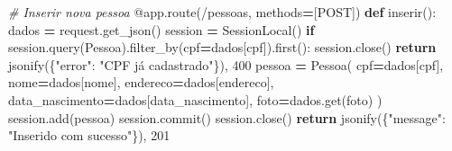 \documentclass[
]{book}
\newenvironment{Shaded}{\begin{snugshade}}{\end{snugshade}}
\newcommand{\AttributeTok}[1]{\textcolor[rgb]{0.13,0.29,0.53}{#1}}
\newcommand{\CommentTok}[1]{\textcolor[rgb]{0.56,0.35,0.01}{\textit{#1}}}
\newcommand{\ControlFlowTok}[1]{\textcolor[rgb]{0.13,0.29,0.53}{\textbf{#1}}}
\newcommand{\DecValTok}[1]{\textcolor[rgb]{0.00,0.00,0.81}{#1}}
\newcommand{\KeywordTok}[1]{\textcolor[rgb]{0.13,0.29,0.53}{\textbf{#1}}}
\newcommand{\NormalTok}[1]{#1}
\newcommand{\OperatorTok}[1]{\textcolor[rgb]{0.81,0.36,0.00}{\textbf{#1}}}
\newcommand{\StringTok}[1]{\textcolor[rgb]{0.31,0.60,0.02}{#1}}
\begin{document}
\begin{Shaded}
\begin{Highlighting}[]
\CommentTok{\# Inserir nova pessoa}
\AttributeTok{@app.route}\NormalTok{(}\StringTok{\textquotesingle{}/pessoas\textquotesingle{}}\NormalTok{, methods}\OperatorTok{=}\NormalTok{[}\StringTok{\textquotesingle{}POST\textquotesingle{}}\NormalTok{])}
\KeywordTok{def}\NormalTok{ inserir():}
\NormalTok{    dados }\OperatorTok{=}\NormalTok{ request.get\_json()}
\NormalTok{    session }\OperatorTok{=}\NormalTok{ SessionLocal()}
    \ControlFlowTok{if}\NormalTok{ session.query(Pessoa).filter\_by(cpf}\OperatorTok{=}\NormalTok{dados[}\StringTok{\textquotesingle{}cpf\textquotesingle{}}\NormalTok{]).first():}
\NormalTok{        session.close()}
        \ControlFlowTok{return}\NormalTok{ jsonify(\{}\StringTok{"error"}\NormalTok{: }\StringTok{"CPF já cadastrado"}\NormalTok{\}), }\DecValTok{400}
\NormalTok{    pessoa }\OperatorTok{=}\NormalTok{ Pessoa(}
\NormalTok{        cpf}\OperatorTok{=}\NormalTok{dados[}\StringTok{\textquotesingle{}cpf\textquotesingle{}}\NormalTok{],}
\NormalTok{        nome}\OperatorTok{=}\NormalTok{dados[}\StringTok{\textquotesingle{}nome\textquotesingle{}}\NormalTok{],}
\NormalTok{        endereco}\OperatorTok{=}\NormalTok{dados[}\StringTok{\textquotesingle{}endereco\textquotesingle{}}\NormalTok{],}
\NormalTok{        data\_nascimento}\OperatorTok{=}\NormalTok{dados[}\StringTok{\textquotesingle{}data\_nascimento\textquotesingle{}}\NormalTok{],}
\NormalTok{        foto}\OperatorTok{=}\NormalTok{dados.get(}\StringTok{\textquotesingle{}foto\textquotesingle{}}\NormalTok{)}
\NormalTok{    )}
\NormalTok{    session.add(pessoa)}
\NormalTok{    session.commit()}
\NormalTok{    session.close()}
    \ControlFlowTok{return}\NormalTok{ jsonify(\{}\StringTok{"message"}\NormalTok{: }\StringTok{"Inserido com sucesso"}\NormalTok{\}), }\DecValTok{201}


\end{Highlighting}
\end{Shaded}
\end{document}
